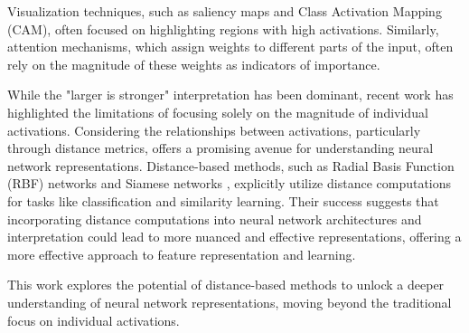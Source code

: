 Visualization techniques, such as saliency maps and Class Activation Mapping (CAM), often focused on highlighting regions with high activations. Similarly, attention mechanisms, which assign weights to different parts of the input, often rely on the magnitude of these weights as indicators of importance.

While the "larger is stronger" interpretation has been dominant, recent work has highlighted the limitations of focusing solely on the magnitude of individual activations. \cite{rudin2019stop} Considering the relationships between activations, particularly through distance metrics, offers a promising avenue for understanding neural network representations. \cite{goodfellow2014explaining,madry2017towards,szegedy2013intriguing} Distance-based methods, such as Radial Basis Function (RBF) networks \cite{broomhead1988radial} and Siamese networks \cite{bromley1994signature,schroff2015facenet}, explicitly utilize distance computations for tasks like classification and similarity learning. Their success suggests that incorporating distance computations into neural network architectures and interpretation could lead to more nuanced and effective representations, offering a more effective approach to feature representation and learning.

This work explores the potential of distance-based methods to unlock a deeper understanding of neural network representations, moving beyond the traditional focus on individual activations.